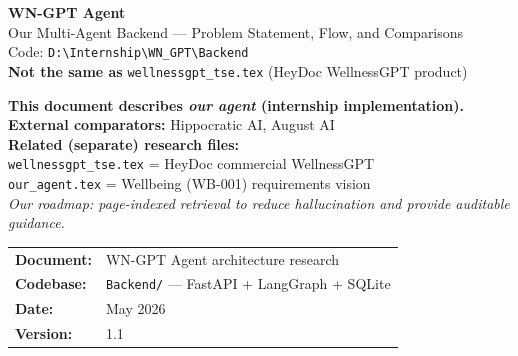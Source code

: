 \documentclass[12pt,a4paper]{article}
\begin{document}
\begin{titlepage}
    \centering\vspace*{1.5cm}
    {\Huge\bfseries\color{primaryblue} WN-GPT Agent}\\[0.4cm]
    {\Large\color{accentteal} Our Multi-Agent Backend --- Problem Statement, Flow, and Comparisons}\\[0.3cm]
    {\large\color{darkgray} Code: \texttt{D:\textbackslash Internship\textbackslash WN\_GPT\textbackslash Backend}}\\[0.2cm]
    {\large\color{warningred} \textbf{Not the same as} \texttt{wellnessgpt\_tse.tex} (HeyDoc WellnessGPT product)}\\[1.2cm]

    \begin{mdframed}[backgroundcolor=lightgray, linecolor=primaryblue, linewidth=1.5pt, roundcorner=5pt]
        \centering\vspace{0.4cm}
        \textbf{This document describes \emph{our agent} (internship implementation).}\\[0.2cm]
        \textbf{External comparators:} Hippocratic AI, August AI\\
        \textbf{Related (separate) research files:}\\
        \texttt{wellnessgpt\_tse.tex} = HeyDoc commercial WellnessGPT\\
        \texttt{our\_agent.tex} = Wellbeing (WB-001) requirements vision\\
        \vspace{0.3cm}
        \textit{Our roadmap: page-indexed retrieval to reduce hallucination and provide auditable guidance.}
        \vspace{0.4cm}
    \end{mdframed}

    \vfill
    \begin{tabular}{ll}
        \textbf{Document:}   & WN-GPT Agent architecture research \\
        \textbf{Codebase:} & \texttt{Backend/} --- FastAPI + LangGraph + SQLite \\
        \textbf{Date:}     & May 2026 \\
        \textbf{Version:}  & 1.1 \\
    \end{tabular}
\end{titlepage}
\end{document}
